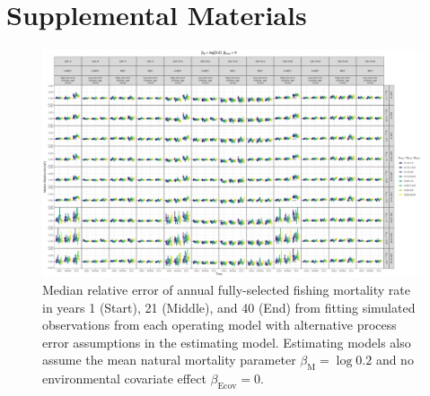 \documentclass[
  12pt,
]{article}
\begin{document}
\hypertarget{supplemental-materials}{%
\section*{Supplemental Materials}\label{supplemental-materials}}

\begin{landscape}
\begin{figure}
\caption{Median relative error of annual fully-selected fishing mortality rate in years 1 (Start), 21 (Middle), and 40 (End) from fitting simulated observations from each operating model with alternative process error assumptions in the estimating model. Estimating models also assume the mean natural mortality parameter $\beta_\text{M} = \log 0.2$ and no environmental covariate effect $\beta_\text{Ecov} = 0$.}\label{F_bias_M_fixed_beta_fixed}
\begin{center}
\includegraphics[height = \textheight]{F_bias_all_PE_effect_M_fixed_beta_fixed.png}
\end{center}
\end{figure}
\end{landscape}
\end{document}
